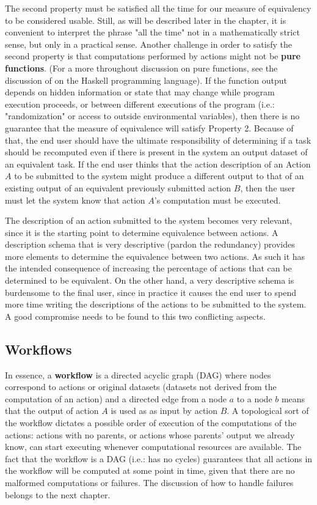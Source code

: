The second property must be satisfied all the time for our measure of equivalency to be considered usable. Still, as will be described later in the chapter, it is convenient to interpret the phrase "all the time" not in a mathematically strict sense, but only in a practical sense.  Another challenge in order to satisfy the second property is that computations performed by actions might not be \textbf{pure functions}. (For a more throughout discussion on pure functions, see the discussion of \cite{jones2003} on the Haskell programming language). If the function output depends on hidden information or state that may change while program execution proceeds, or between different executions of the program (i.e.: "randomization" or access to outside environmental variables), then there is no guarantee that the measure of equivalence will satisfy Property 2.  Because of that, the end user should have the ultimate responsibility of determining if a task should be recomputed even if there is present in the system an output dataset of an equivalent task.  If the end user thinks that the action description of an Action $A$ to be submitted to the system might produce a different output to that of an existing output of an equivalent previously submitted action $B$, then the user must let the system know that action $A$'s computation must be executed.

The description of an action submitted to the system becomes very relevant, since it is the starting point to determine equivalence between actions. A description schema that is very descriptive (pardon the redundancy) provides more elements to determine the equivalence between two actions.  As such it has the intended consequence of increasing the percentage of actions that can be determined to be equivalent. On the other hand, a very descriptive schema is burdensome to the final user, since in practice it causes the end user to spend more time writing the descriptions of the actions to be submitted to the system.  A good compromise needs to be found to this two conflicting aspects.

\subsection{Workflows}
In essence, a \textbf{workflow} is a directed acyclic graph (DAG) where nodes correspond to actions or original datasets (datasets not derived from the computation of an action) and a directed edge from a node $a$ to a node $b$ means that the output of action $A$ is used as as input by action $B$.  A topological sort of the workflow dictates a possible order of execution of the computations of the actions: actions with no parents, or actions whose parents' output we already know, can start executing whenever computational resources are available. The fact that the workflow is a DAG (i.e.: has no cycles) guarantees that all actions in the workflow will be computed at some point in time, given that there are no malformed computations or failures.  The discussion of how to handle failures belongs to the next chapter.


